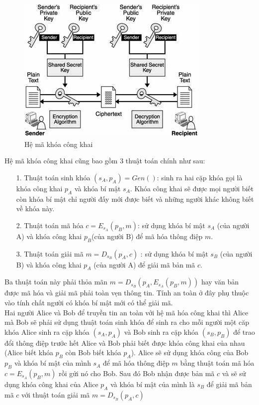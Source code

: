 \documentclass[a4paper,12pt]{report}
\begin{document}
\begin{center}
\begin{figure}[h]
\centering
\includegraphics[width=0.6\linewidth]{../3.jpg} 
\caption{Hệ mã khóa công khai}
\end{figure}
\end{center}

Hệ mã khóa công khai cũng bao gồm 3 thuật toán chính như sau:
\begin{itemize}
\item[1. ] Thuật toán sinh khóa $(s_A, p_A)=Gen()$: sinh ra hai cặp khóa gọi là khóa công khai $p_A$ và khóa bí mật $s_A$. Khóa công khai sẽ được mọi người biết còn khóa bí mật chỉ người đấy mới được biết và những người khác không biết về khóa này.
\item[2. ] Thuật toán mã hóa $c = E_{s_A}(p_B,m)$: sử dụng khóa bí mật $s_A$ (của người A) và khóa công khai $p_B$(của người B) để mã hóa thông điệp $m$.
\item[3. ] Thuật toán giải mã $m = D_{s_B}(p_A,c)$ : sử dụng khóa bí mật $s_B$ (của người B) và khóa công khai $p_A$ (của người A) để giải mã bản mã $c$. 
\end{itemize}

Ba thuật toán này phải thỏa mãn $m = D_{s_B}(p_A, E_{s_A}(p_B, m))$ hay văn bản được mã hóa và giải mã phải toàn vẹn thông tin. Tính an toàn ở đây phụ thuộc vào tính chất người có khóa bí mật mới có thể giải mã. \\

Hai người Alice và Bob để truyền tin an toàn với hệ mã hóa công khai thì Alice mà Bob sẽ phải sử dụng thuật toán sinh khóa để sinh ra cho mỗi người một căp khóa Alice sinh ra cặp khóa $(s_A, p_A)$ và Bob sinh ra cặp khóa $(s_B, p_B)$ để trao đổi thông điệp trước hết Alice và Bob phải biết được khóa công khai của nhau (Alice biết khóa $p_B$ còn Bob biết khóa $p_A$). Alice sẽ sử dụng khóa công của Bob $p_B$ và khóa bí mật của mình $s_A$ để mã hóa thông điệp $m$ bằng thuật toán mã hóa $c = E_{s_A}(p_B,m)$ rồi gửi nó cho Bob. Sau đó Bob nhận được bản mã $c$ và sẽ sử dụng khóa công khai của Alice $p_A$ và khóa bí mật của mình là $s_B$ để giải mã bản mã $c$ với thuật toán giải mã $m = D_{s_B}(p_A,c)$ \\
\end{document}
